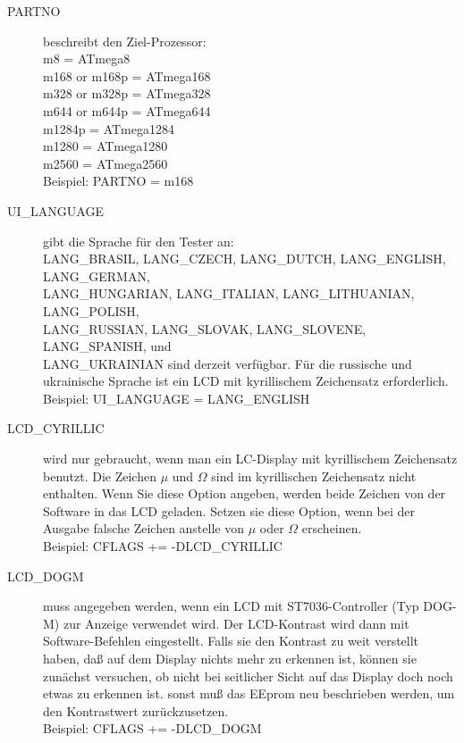 \begin{description}
  \item[PARTNO] beschreibt den Ziel-Prozessor:\\
         m8 = ATmega8\\
         m168 or m168p = ATmega168\\
         m328 or m328p = ATmega328\\
         m644 or m644p = ATmega644\\
         m1284p        = ATmega1284\\
         m1280         = ATmega1280\\
         m2560         = ATmega2560\\
    Beispiel: PARTNO = m168

  \item[UI\_LANGUAGE] gibt die Sprache für den Tester an:\\
    LANG\_BRASIL, LANG\_CZECH, LANG\_DUTCH, LANG\_ENGLISH, LANG\_GERMAN, \\
    LANG\_HUNGARIAN, LANG\_ITALIAN, LANG\_LITHUANIAN, LANG\_POLISH, \\
    LANG\_RUSSIAN, LANG\_SLOVAK, LANG\_SLOVENE, LANG\_SPANISH, und \\
    LANG\_UKRAINIAN sind derzeit verfügbar.
 Für die russische und ukrainische Sprache ist ein LCD mit kyrillischem Zeichensatz erforderlich.\\
    Beispiel: UI\_LANGUAGE = LANG\_ENGLISH

  \item[LCD\_CYRILLIC] wird nur gebraucht, wenn man ein LC-Display mit kyrillischem Zeichensatz benutzt.
Die Zeichen \(\mu\) und \(\Omega\) sind im kyrillischen Zeichensatz nicht enthalten.
Wenn Sie diese Option angeben, werden beide Zeichen von der Software in das LCD geladen.
Setzen sie diese Option, wenn bei der Ausgabe falsche Zeichen anstelle von \(\mu\) oder \(\Omega\) erscheinen.\\
Beispiel: CFLAGS += -DLCD\_CYRILLIC

  \item[LCD\_DOGM] muss angegeben werden, wenn ein LCD mit ST7036-Controller (Typ DOG-M) zur Anzeige verwendet wird.
Der LCD-Kontrast wird dann mit Software-Befehlen eingestellt.
Falls sie den Kontrast zu weit verstellt haben, daß auf dem Display nichts mehr zu erkennen ist,
können sie zunächst versuchen, ob nicht bei seitlicher Sicht auf das Display doch noch etwas zu erkennen ist.
sonst muß das EEprom neu beschrieben werden, um den Kontrastwert zurückzusetzen.\\
Beispiel: CFLAGS += -DLCD\_DOGM


\end{description}
